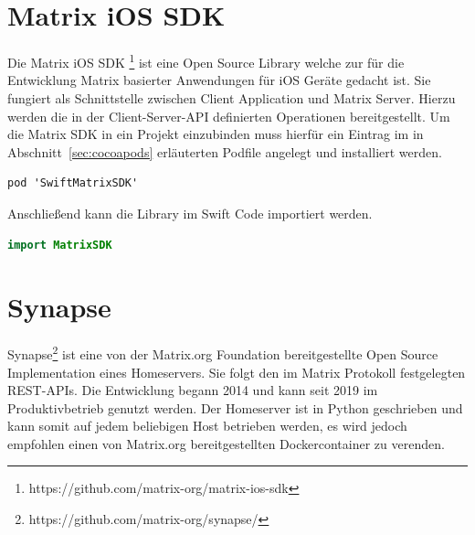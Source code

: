     \section{Matrix iOS SDK}\label{sec:matrix-sdk}
    Die Matrix iOS SDK \footnote{https://github.com/matrix-org/matrix-ios-sdk} ist eine Open Source Library welche zur für die Entwicklung Matrix basierter Anwendungen für iOS Geräte gedacht ist.
    Sie fungiert als Schnittstelle zwischen Client Application und Matrix Server.
    Hierzu werden die in der Client-Server-API definierten Operationen bereitgestellt.
    Um die Matrix SDK in ein Projekt einzubinden muss hierfür ein Eintrag im in Abschnitt~\ref{sec:cocoapods} erläuterten Podfile angelegt und installiert werden.
    ~\cite{matrixiossdk}
    \begin{lstlisting}[language={},label={lst:matrtix-sdk}]
        pod 'SwiftMatrixSDK'
    \end{lstlisting}
    Anschließend kann die Library im Swift Code importiert werden.
    \begin{lstlisting}[language=swift,label={lst:matrtix-sdk-swift}]
        import MatrixSDK
    \end{lstlisting}

    \section{Synapse}\label{sec:synapse}
    Synapse\footnote{https://github.com/matrix-org/synapse/} ist eine von der Matrix.org Foundation bereitgestellte Open Source Implementation eines Homeservers.
    Sie folgt den im Matrix Protokoll festgelegten REST-APIs.
    Die Entwicklung begann 2014 und kann seit 2019 im Produktivbetrieb genutzt werden.
    Der Homeserver ist in Python geschrieben und kann somit auf jedem beliebigen Host betrieben werden, es wird jedoch empfohlen einen von Matrix.org bereitgestellten Dockercontainer zu verenden.

